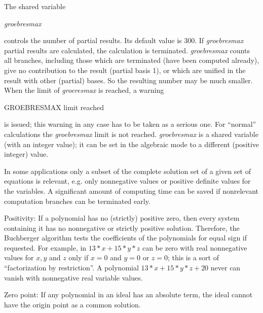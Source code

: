 The shared variable
\hypertarget{reserved:GROEBRESMAX}{}
\begin{center}
\emph{groebresmax}
\end{center}
controls the number of partial results. Its default value is 300. If
\emph{groebresmax} partial results are calculated, the calculation is
terminated. \emph{groebresmax} counts all branches, including those which
are terminated (have been computed already), give no contribution to
the result (partial basis 1), or which are unified in the result with
other (partial) bases. So the resulting number may be much smaller.
When the limit of \emph{groeresmax} is reached, a warning

GROEBRESMAX limit reached

is issued; this warning in any case has to be taken as a serious one.
For ``normal'' calculations the \emph{groebresmax} limit is not reached.
\emph{groebresmax} is a shared variable (with an integer value); it can be
set in the algebraic mode to a different (positive integer) value.

In some applications only a subset of the complete solution set
of a given set of equations is relevant, e.g. only
nonnegative values or positive definite values for the variables.
A significant amount of computing time can be saved if
nonrelevant computation branches can be terminated early.

Positivity: If a polynomial has no (strictly) positive zero, then
every system containing it has no nonnegative or strictly positive
solution. Therefore, the Buchberger algorithm tests the coefficients of
the polynomials for equal sign if requested. For example, in $13*x +
15*y*z $ can be zero with real nonnegative values for $x, y$ and $z$
only if $x=0$ and $y=0$ or $ z=0$; this is a sort of ``factorization by
restriction''. A polynomial $13*x + 15*y*z + 20$ never can vanish
with nonnegative real variable values.

Zero point:  If any polynomial in an ideal has an absolute term, the ideal
cannot have the origin point as a common solution.

